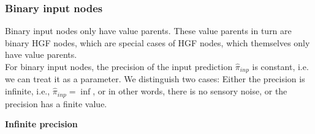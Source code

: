 \subsubsection{Binary input nodes}
Binary input nodes only have value parents. These value parents in turn are binary HGF nodes, which are special cases of HGF nodes, which themselves only have value parents.\\

For binary input nodes, the precision of the input prediction $\hat{\pi}_{inp}$ is constant, i.e. we can treat it as a parameter. We distinguish two cases: Either the precision is infinite, i.e., $\hat{\pi}_{inp} = \inf$, or in other words, there is no sensory noise, or the precision has a finite value.

\textbf{Infinite precision}\\
\noindent



